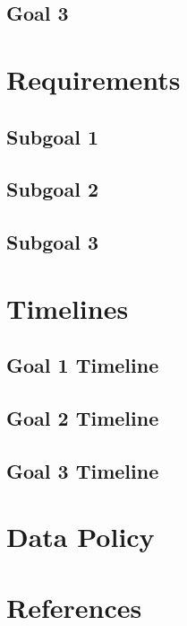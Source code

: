 \documentclass[fleqn]{article}
\begin{document}
\subsection{Goal 3}


\section{Requirements}
\subsection{Subgoal 1}
\subsection{Subgoal 2}
\subsection{Subgoal 3}

\section{Timelines}
\subsection{Goal 1 Timeline}
\subsection{Goal 2 Timeline}
\subsection{Goal 3 Timeline}

\section{Data Policy}

\section{References}
\end{document}

